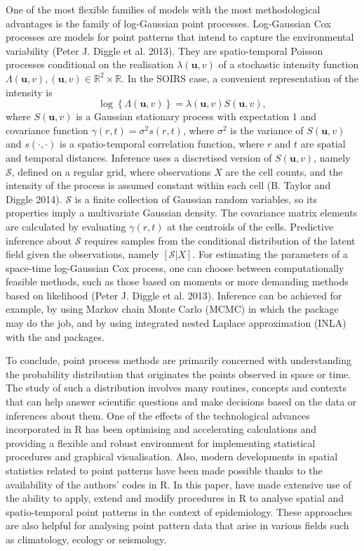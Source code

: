 One of the most flexible families of models with the most methodological advantages is the family of log-Gaussian point processes. Log-Gaussian Cox processes are models for point patterns that intend to capture the environmental variability (Peter J. Diggle et al. 2013). They are spatio-temporal Poisson processes conditional on the realisation \(\lambda(\mathbf{u},v)\) of a stochastic intensity function \(\Lambda(\mathbf{u},v), (\mathbf{u},v)\in \mathbb{R}^2\times \mathbb{R}\). In the SOIRS case, a convenient representation of the intensity is
\[
    \log \left\{ \Lambda(\mathbf{u},v) \right\}= \lambda(\mathbf{u},v)S(\mathbf{u},v),
\]
where \(S(\mathbf{u},v)\) is a Gaussian stationary process with expectation \(1\) and covariance function \(\gamma(r,t)=\sigma^2 s(r,t)\), where \(\sigma^2\) is the variance of \(S(\mathbf{u}, v)\) and \(s(\cdot, \cdot)\) is a spatio-temporal correlation function, where \(r\) and \(t\) are spatial and temporal distances. Inference uses a discretised version of \(S(\mathbf{u},v)\), namely \(\mathcal{S}\), defined on a regular grid, where observations \(X\) are the cell counts, and the intensity of the process is assumed constant within each cell (B. Taylor and Diggle 2014). \(\mathcal{S}\) is a finite collection of Gaussian random variables, so its properties imply a multivariate Gaussian density. The covariance matrix elements are calculated by evaluating \(\gamma(r,t)\) at the centroids of the cells. Predictive inference about \(\mathcal{S}\) requires samples from the conditional distribution of the latent field given the observations, namely \([\mathcal{S}|X]\). For estimating the parameters of a space-time log-Gaussian Cox process, one can choose between computationally feasible methods, such as those based on moments or more demanding methods based on likelihood (Peter J. Diggle et al. 2013). Inference can be achieved for example, by using Markov chain Monte Carlo (MCMC) in which the  package may do the job, and by using integrated nested Laplace approximation (INLA) with the  and  packages.

To conclude, point process methods are primarily concerned with understanding the probability distribution that originates the points observed in space or time. The study of such a distribution involves many routines, concepts and contexts that can help answer scientific questions and make decisions based on the data or inferences about them. One of the effects of the technological advances incorporated in R has been optimising and accelerating calculations and providing a flexible and robust environment for implementing statistical procedures and graphical visualisation. Also, modern developments in spatial statistics related to point patterns have been made possible thanks to the availability of the authors' codes in R. In this paper, have made extensive use of the ability to apply, extend and modify procedures in R to analyse spatial and spatio-temporal point patterns in the context of epidemiology. These approaches are also helpful for analysing point pattern data that arise in various fields such as climatology, ecology or seismology.

